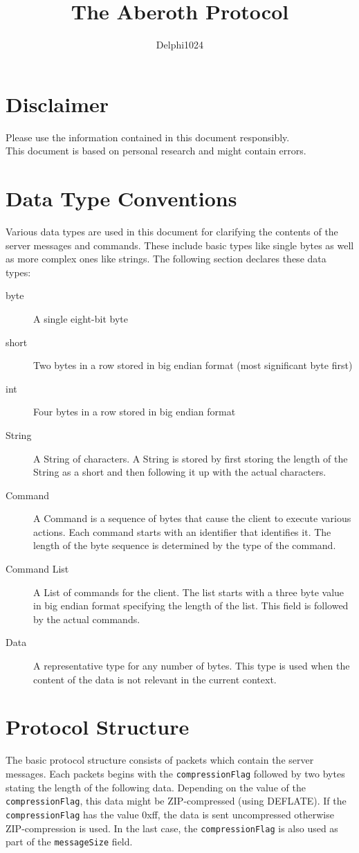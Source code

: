 \documentclass{article}
\newcommand{\field}[1]{\textcolor{fieldColor}{\texttt{#1}}}
\begin{document}
\title{The Aberoth Protocol}
\author{Delphi1024}
\maketitle

\section{Disclaimer}
Please use the information contained in this document responsibly.\\
This document is based on personal research and might contain errors.

\section{Data Type Conventions}
Various data types are used in this document for clarifying the contents of the server messages and commands. These include basic types like single bytes as well as more complex ones like strings.
The following section declares these data types:
\begin{description}
\item [byte] A single eight-bit byte
\item [short] Two bytes in a row stored in big endian format (most significant byte first)
\item [int] Four bytes in a row stored in big endian format
\item [String] A String of characters. A String is stored by first storing the length of the String as a short and then following it up with the actual characters.
\item [Command] A Command is a sequence of bytes that cause the client to execute various actions. Each command starts with an identifier that identifies it.
The length of the byte sequence is determined by the type of the command.
\item [Command List] A List of commands for the client. The list starts with a three byte value in big endian format specifying the length of the list. This field is followed by the 
actual commands.
\item [Data] A representative type for any number of bytes. This type is used when the content of the data is not relevant in the current context.
\end{description}


\section{Protocol Structure}
The basic protocol structure consists of packets which contain the server messages. Each packets begins with the \field{compressionFlag} followed by two bytes stating the length of the following data.
Depending on the value of the \field{compressionFlag}, this data might be ZIP-compressed (using DEFLATE). If the \field{compressionFlag} has the value 0xff, the data is sent uncompressed otherwise ZIP-compression is used.
In the last case, the \field{compressionFlag} is also used as part of the \field{messageSize} field.
\end{document}
